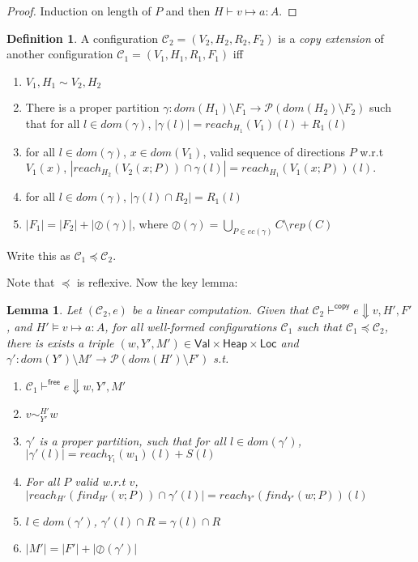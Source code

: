 \documentclass[11pt]{article}
\newcommand{\ms}[1]{\ensuremath{\mathsf{#1}}}
\newcommand{\veq}[4]{#3 \sim^{#1}_{#2} #4}
\newcommand{\oh}[1]{\oslash(#1)}
\newtheorem{lemma}[theorem]{Lemma}
\theoremstyle{definition}
\newtheorem{definition}{Definition}[section]
\begin{document}
\begin{proof}
	Induction on length of $P$ and then $H \vdash v \mapsto a : A$.
\end{proof}

\begin{definition}
A configuration $\mathcal{C}_2 = (V_2,H_2,R_2,F_2)$ is a \emph{copy extension} of another configuration
$\mathcal{C}_1 = (V_1,H_1,R_1,F_1)$ iff
\begin{enumerate}
\item $V_1,H_1 \sim V_2,H_2$
\item There is a proper partition $\gamma : dom(H_1) \setminus F_1 \to \mathcal{P}(dom(H_2) \setminus F_2)$ 
such that for all $l \in dom(\gamma)$, $|\gamma(l)| = reach_{H_1}(V_1)(l) + R_1(l)$
\item for all $l \in dom(\gamma)$, $x \in dom(V_1)$, valid sequence of directions $P$ w.r.t $V_1(x)$,
	$|reach_{H_2}(V_2(x;P)) \cap \gamma(l)| = reach_{H_1}(V_1(x;P))(l)$.
\item for all $l \in dom(\gamma)$, $|\gamma(l) \cap R_2| = R_1(l)$
\item $|F_1| = |F_2| + |\oh{\gamma}|$, where 
	$\oh{\gamma} = \bigcup_{P \in ec(\gamma)} C \setminus rep(C)$
\end{enumerate}
Write this as $\mathcal{C}_1 \preceq \mathcal{C}_2$.
\end{definition} 

Note that $\preceq$ is reflexive. Now the key lemma:

\begin{lemma}
	Let $(\mathcal{C}_2,e)$ be a linear computation. Given that 
	$\mathcal{C}_2 \vdash^{\mathsf{copy}} e \Downarrow v,H',F'$, and $H' \vDash v \mapsto a : A$, 
	for all well-formed configurations $\mathcal{C}_1$ such that $\mathcal{C}_1 \preceq \mathcal{C}_2$,
there is exists a triple
$(w,Y',M') \in \ms{Val} \times \ms{Heap} \times \ms{Loc}$ and 
	$\gamma' : dom(Y') \setminus M' \to \mathcal{P}(dom(H') \setminus F')$ s.t.
	\begin{enumerate}
			\item $\mathcal{C}_1 \vdash^{\mathsf{free}} e \Downarrow w,Y',M'$
			\item $\veq{H'}{Y'}{v}{w}$
			\item $\gamma'$ is a proper partition, such that for all $l \in dom(\gamma')$, 
				$|\gamma'(l)| = reach_{Y_1}(w_1)(l) + S(l)$
			\item For all $P$ valid w.r.t $v$, $|reach_{H'}(find_{H'}(v;P)) \cap \gamma'(l)| = 
				reach_{Y'}(find_{Y'}(w;P))(l)$
			\item $l \in dom(\gamma')$, 
					$\gamma'(l) \cap R = \gamma(l) \cap R$ 
			\item $|M'| = |F'| + |\oh{\gamma'}|$
	\end{enumerate}
\end{lemma}
\end{document}
